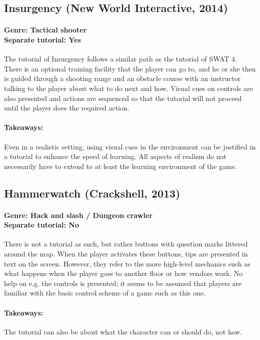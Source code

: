 \subsection{Insurgency (New World Interactive, 2014)}
\paragraph{Genre: Tactical shooter \\ Separate tutorial: Yes \\}
The tutorial of Insurgency follows a similar path as the tutorial of SWAT 4. There is an optional training facility that the player can go to, and he or she then is guided through a shooting range and an obstacle course with an instructor talking to the player about what to do next and how. Visual cues on controls are also presented and actions are sequenced so that the tutorial will not proceed until the player does the required action. 
\paragraph{Takeaways:}
Even in a realistic setting, using visual cues in the environment can be justified in a tutorial to enhance the speed of learning. All aspects of realism do not necessarily have to extend to at least the learning environment of the game.

\subsection{Hammerwatch (Crackshell, 2013)}
\paragraph{Genre: Hack and slash / Dungeon crawler \\ Separate tutorial: No \\}
There is not a tutorial as such, but rather buttons with question marks littered around the map. When the player activates these buttons, tips are presented in text on the screen. However, they refer to the more high-level mechanics such as what happens when the player goes to another floor or how vendors work. No help on e.g. the controls is presented; it seems to be assumed that players are familiar with the basic control scheme of a game such as this one.
\paragraph{Takeaways:}
The tutorial can also be about what the character can or should do, not how.




